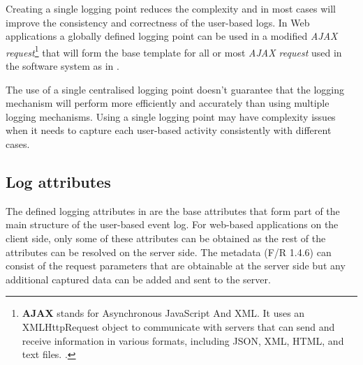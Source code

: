 Creating a single logging point reduces the complexity and in most cases will improve the consistency and correctness of the user-based logs. In Web applications a globally defined logging point can be used in a modified \textit{AJAX request}\footnote{\textbf{AJAX} stands for Asynchronous JavaScript And XML. It uses an XMLHttpRequest object to communicate with servers that can send and receive information in various formats, including JSON, XML, HTML, and text files. \cite{Mozilla2022a}.} that will form the base template for all or most \textit{AJAX request} used in the software system as in .\par The use of a single centralised logging point doesn't guarantee that the logging mechanism will perform more efficiently and accurately than using multiple logging mechanisms. Using a single logging point may have complexity issues when it needs to capture each user-based activity consistently with different cases.

\subsection{Log attributes}
The defined logging attributes in  are the base attributes that form part of the main structure of the user-based event log. For web-based applications on the
client side, only some of these attributes can be obtained as the rest of the attributes can be resolved on the server side. The metadata (F/R 1.4.6) can consist of the request parameters that are
obtainable at the server side but any additional captured data can be added and sent to the server.

